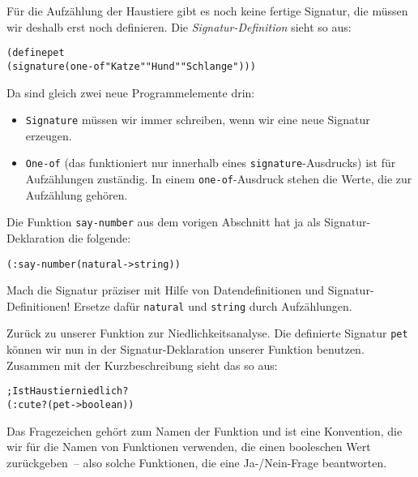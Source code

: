 Für die Aufzählung der Haustiere gibt es noch keine fertige Signatur,
die müssen wir deshalb erst noch definieren.  Die
\textit{Signatur-Definition} sieht so
aus:
\label{sec:pet}
%
\begin{alltt}
(define pet
  (signature (one-of "Katze" "Hund" "Schlange")))
\end{alltt}
%
Da sind gleich zwei neue Programmelemente drin:
%
\begin{itemize}
\item \texttt{Signature} müssen wir immer schreiben, wenn wir eine
  neue Signatur erzeugen.
\item \texttt{One-of} (das funktioniert
  nur innerhalb eines \texttt{signature}-Ausdrucks) ist für
  Aufzählungen zuständig.  In einem \texttt{one-of}-Ausdruck stehen
  die Werte, die zur Aufzählung gehören.
\end{itemize}
%
\begin{aufgabe}
  Die Funktion \texttt{say-number} aus dem vorigen Abschnitt hat ja als
  Signatur-Deklaration die folgende:
\begin{alltt}
(: say-number (natural -> string))
\end{alltt}
  Mach die Signatur präziser mit Hilfe von Datendefinitionen und
  Signatur-Definitionen!  Ersetze dafür \texttt{natural} und
  \texttt{string} durch Aufzählungen.
\end{aufgabe}
%
Zurück zu unserer Funktion zur Niedlichkeitsanalyse.  Die definierte
Signatur \texttt{pet} können wir nun in der Signatur-Deklaration
unserer Funktion benutzen.  Zusammen mit der Kurzbeschreibung sieht
das so aus:
%
\begin{alltt}
; Ist Haustier niedlich?
(: cute? (pet -> boolean))
\end{alltt}
%
Das Fragezeichen gehört zum Namen der Funktion und ist eine
Konvention, die wir für die Namen von Funktionen verwenden, die einen
booleschen Wert zurückgeben~-- also solche Funktionen, die eine
Ja-/Nein-Frage beantworten.

